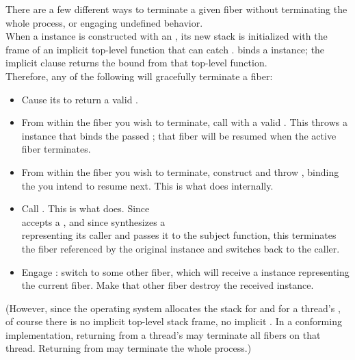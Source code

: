 
There are a few different ways to terminate a given fiber without
terminating the whole process, or engaging undefined behavior.\\

When a \fiber instance is constructed with an \entryfn, its new stack is
initialized with the frame of an implicit top-level function that can
catch \unwindex. \unwindex binds a \fiber instance; the implicit 
clause returns the bound \fiber from that top-level function.\\

Therefore, any of the following will gracefully terminate a fiber:

\begin{itemize}
    \item Cause its \entryfn to return a valid \fiber.
    \item From within the fiber you wish to terminate, call \unwindfib with a
          valid \fiber. This throws a \unwindex instance that binds the passed
          \fiber; that fiber will be resumed when the active fiber terminates.
    \item From within the fiber you wish to terminate, construct and
          throw \unwindex, binding the \fiber you intend to resume next. This
          is what \unwindfib does internally.
    \item Call . This is what \dtor
          does. Since\\\unwindfib accepts a \fiber, and since \resumewith
          synthesizes a\\\fiber representing its caller and passes it to the
          subject function, this terminates the fiber referenced by the
          original \fiber instance and switches back to the caller.
    \item Engage \dtor: switch to some other fiber, which will
          receive a \fiber instance representing the current fiber. Make that
          other fiber destroy the received \fiber instance.
\end{itemize}

(However, since the operating system allocates the stack for \main and for a
thread's \entryfn, of course there is no implicit top-level stack frame, no
implicit . In a conforming implementation,
returning from a thread's \entryfn\xspace may terminate all fibers on that
thread. Returning from \main may terminate the whole process.)\\

